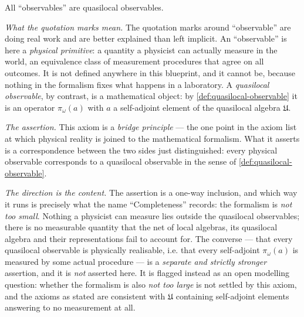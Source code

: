\begin{definition}
    \label{def:quasilocal-completeness}
    \leanok
    All ``observables'' are quasilocal observables.

    \emph{What the quotation marks mean.} The quotation marks around ``observable'' are doing real work and are better explained than left implicit. An ``observable'' is here a \emph{physical primitive}: a quantity a physicist can actually measure in the world, an equivalence class of measurement procedures that agree on all outcomes. It is not defined anywhere in this blueprint, and it cannot be, because nothing in the formalism fixes what happens in a laboratory. A \emph{quasilocal observable}, by contrast, is a mathematical object: by \ref{def:quasilocal-observable} it is an operator $\pi_\omega(a)$ with $a$ a self-adjoint element of the quasilocal algebra $\mathfrak{U}$.

    \emph{The assertion.} This axiom is a \emph{bridge principle} --- the one point in the axiom list at which physical reality is joined to the mathematical formalism. What it asserts is a correspondence between the two sides just distinguished: every physical observable corresponds to a quasilocal observable in the sense of \ref{def:quasilocal-observable}.

    \emph{The direction is the content.} The assertion is a one-way inclusion, and which way it runs is precisely what the name ``Completeness'' records: the formalism is \emph{not too small}. Nothing a physicist can measure lies outside the quasilocal observables; there is no measurable quantity that the net of local algebras, its quasilocal algebra and their representations fail to account for. The converse --- that every quasilocal observable is physically realisable, i.e. that every self-adjoint $\pi_\omega(a)$ is measured by some actual procedure --- is a \emph{separate and strictly stronger} assertion, and it is \emph{not} asserted here. It is flagged instead as an open modelling question: whether the formalism is also \emph{not too large} is not settled by this axiom, and the axioms as stated are consistent with $\mathfrak{U}$ containing self-adjoint elements answering to no measurement at all.


\end{definition}
